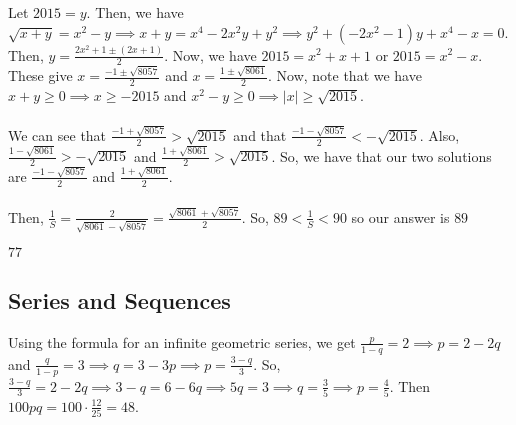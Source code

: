 \documentclass[11pt]{article}
\begin{document}

\begin{sol}
Let $2015=y$. Then, we have $\sqrt{x+y}=x^2-y\implies x+y=x^4-2x^2y+y^2\implies y^2+(-2x^2-1)y+x^4-x=0$. Then, $y=\frac{2x^2+1 \pm (2x+1)}{2}$. Now, we have $2015=x^2+x+1$ or $2015=x^2-x$. These give $x=\frac{-1 \pm \sqrt{8057}}{2}$ and $x=\frac{1 \pm \sqrt{8061}}{2}$. Now, note that we have $x+y\ge 0 \implies x \ge -2015$ and $x^2-y\ge 0\implies |x|\ge \sqrt{2015}$. \\
\\
We can see that $\frac{-1 + \sqrt{8057}}{2}>\sqrt{2015}$ and that $\frac{-1-\sqrt{8057}}{2} < -\sqrt{2015}$. Also, $\frac{1-\sqrt{8061}}{2} > - \sqrt{2015}$ and $\frac{1+\sqrt{8061}}{2} > \sqrt{2015}$. So, we have that our two solutions are $\frac{-1-\sqrt{8057}}{2}$ and $\frac{1+\sqrt{8061}}{2}$. \\
\\
Then, $\frac{1}{S}=\frac{2}{\sqrt{8061}-\sqrt{8057}}=\frac{\sqrt{8061}+\sqrt{8057}}{2}$. So, $89 < \frac{1}{S} < 90$ so our answer is $\boxed{89}$
\end{sol}


\begin{sol}
$\boxed{77}$
\end{sol}
\subsection{Series and Sequences}

\begin{sol}
Using the formula for an infinite geometric series, we get $\frac{p}{1-q}=2\implies p=2-2q$ and $\frac{q}{1-p}=3\implies q=3-3p\implies p=\frac{3-q}{3}$. So, $\frac{3-q}{3}=2-2q\implies 3-q=6-6q\implies 5q=3\implies q =\frac{3}{5}\implies p =\frac{4}{5}$. Then $100pq=100\cdot \frac{12}{25}=\boxed{48}$.
\end{sol}
\end{document}
